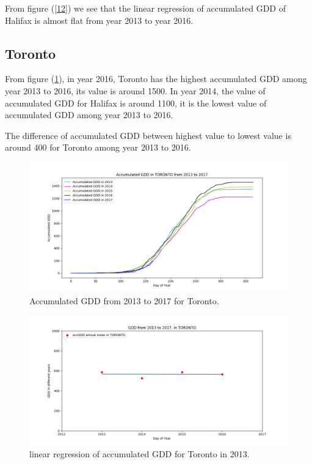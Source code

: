 \documentclass[12pt]{article}
\begin{document}
From figure (\ref{12}) we see that the linear regression of accumulated GDD of Halifax is almost flat from year 2013 to year 2016.
\subsection{Toronto}

From figure (\ref{13}), in year 2016, Toronto has the highest accumulated GDD among year 2013 to 2016, its value is around 1500. In year 2014, the value of accumulated GDD for Halifax is around 1100, it is the lowest value of accumulated GDD among year 2013 to 2016. 

The difference of accumulated GDD between highest value to lowest value is around 400 for Toronto among year 2013 to 2016.

\begin{center}
\begin{figure}[H]
\includegraphics[width=5.25in]{../Plot/TORONTO/accGDD_2013_2017.png}
\caption{Accumulated GDD from 2013 to 2017 for Toronto.}
\label{13}
\end{figure}
\end{center}

\begin{center}
\begin{figure}[H]
\includegraphics[width=5.25in]{../Plot/TORONTO/GDD_LinearRegression_TORONTO.png}
\caption{linear regression of accumulated GDD for Toronto in 2013.}
\label{14}
\end{figure}
\end{center}
\end{document}
